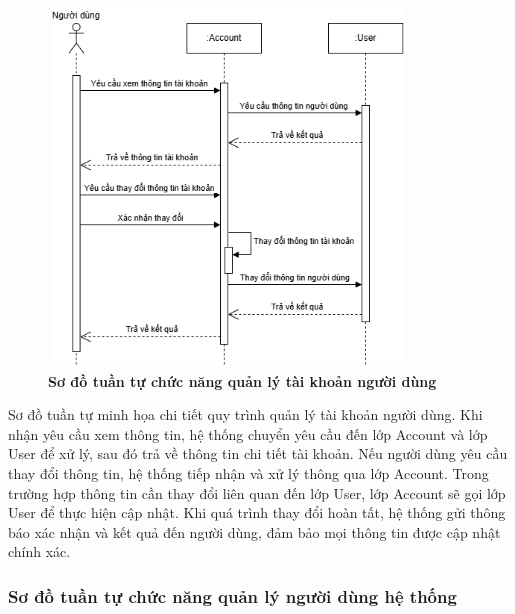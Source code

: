 \begin{figure}[H]
	\centering
	\includegraphics[width=9.5cm,height=9.5cm]{Images/sequence/user/account_info.drawio.png}
	\caption[Sơ đồ tuần tự chức năng quản lý tài khoản người dùng]{\bfseries \fontsize{12pt}{0pt}
		\selectfont Sơ đồ tuần tự chức năng quản lý tài khoản người dùng}
	\label{sequence_account} %
\end{figure}
Sơ đồ tuần tự minh họa chi tiết quy trình quản lý tài khoản người dùng. Khi nhận yêu cầu xem thông tin, hệ thống chuyển yêu cầu đến lớp Account và lớp User để xử lý,
sau đó trả về thông tin chi tiết tài khoản. Nếu người dùng yêu cầu thay đổi thông tin, hệ thống tiếp nhận và xử lý thông qua lớp Account. Trong trường hợp thông tin cần thay đổi liên quan đến lớp User,
lớp Account sẽ gọi lớp User để thực hiện cập nhật. Khi quá trình thay đổi hoàn tất, hệ thống gửi thông báo xác nhận và kết quả đến người dùng, đảm bảo mọi thông tin được cập nhật chính xác.

\subsubsection{Sơ đồ tuần tự chức năng quản lý người dùng hệ thống}

